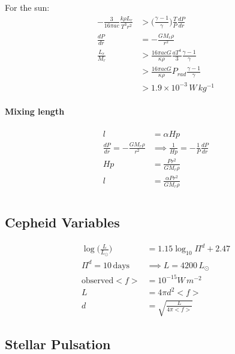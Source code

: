 \documentclass[a4paper,11pt,normalem]{article}
\begin{document}
For the sun:
\begin{align*}
    -\frac{3}{16\pi a c}\frac{k\rho L_r}{T^3 r^2} &>  \Big(\frac{\gamma_{} - 1}{\gamma_{}}\Big)\frac{T}{P} \frac{dP}{dr} \\
    \frac{dP}{dr} &= -\frac{GM_r \rho}{r^2} \\
    \frac{L_r}{M_r} &> \frac{16 \pi a c G}{\kappa\rho} \frac{aT^4}{3} \frac{\gamma - 1}{\gamma} \\
    &> \frac{16 \pi acG}{\kappa\rho}P_{rad}\frac{\gamma - 1}{\gamma} \\
    &> 1.9\times10^{-3}\,W\,kg^{-1}
\end{align*}

\paragraph{Mixing length}
\begin{align*}
    l &= \alpha Hp \\
    \frac{dP}{dr} = - \frac{GM_r \rho}{r^2} &\implies \frac{1}{Hp} = -\frac{1}{P}\frac{dP}{dr} \\
    Hp &= \frac{Pr^2}{GM_r \rho} \\
    l&= \frac{\alpha Pr^2}{GM_r \rho}
\end{align*}

\section{}

\subsection{Cepheid Variables}

\begin{align*}
    \log\bigg(\frac{L}{L_{\odot}}\bigg) &= 1.15\log_{10}\Pi^d + 2.47 \\
    \Pi^d = 10\,\text{days} &\implies L = 4200\,L_{\odot} \\
    \text{observed} <f> &= 10^{-15} W\,m^{-2} \\
    L &= 4\pi d^2 <f> \\
    d &= \sqrt{\frac{L}{4\pi<f>}}
\end{align*}

\subsection{Stellar Pulsation}
\end{document}

